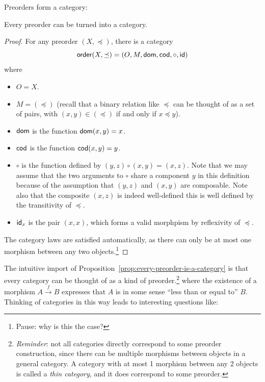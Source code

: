 Preorders form a category:
\begin{construction} \label{prop:every-preorder-is-a-category}
  Every preorder can be turned into a category.
  \label{eq:const-preorder}
\end{construction}
\begin{proof}
  For any preorder \((X,\preceq)\), there is a category
  \[
    \mathsf{order}(X,\preceq) = (O,M,\operatorname{\mathsf{dom}},\operatorname{\mathsf{cod}},\circ,\mathsf{id})
  \]
  where
  \begin{itemize}
    \item \(O = X\).
    \item \(M = (\preceq)\) (recall that a binary relation like \(\preceq\)
      can be thought of as a set of pairs, with \((x,y) \in (\preceq)\)
      if and only if \(x\preceq y\)).
    \item \(\operatorname{\mathsf{dom}}\) is the function \(\operatorname{\mathsf{dom}}(x,y) = x\).
    \item \(\operatorname{\mathsf{cod}}\) is the function \(\operatorname{\mathsf{cod}}(x,y) = y\).
    \item \(\circ\) is the function defined by \((y,z)\circ(x,y) = (x,z)\).
      Note that we may assume that the two arguments to \(\circ\)
      share a component \(y\) in this definition because of the assumption
      that \((y,z)\) and \((x,y)\) are composable.
      Note also that the composite \((x,z)\) is indeed well-defined
      this is well defined by the transitivity of \(\preceq\).
    \item \(\mathsf{id}_x\) is the pair \((x,x)\), which forms a valid morphpism
      by reflexivity of \(\preceq\).
  \end{itemize}
  The category laws are satisfied automatically,
  as there can only be at most one morphism between any two objects.\footnote{Pause: 
  why is this the case?}
\end{proof}
\noindent
The intuitive import of Proposition~\ref{prop:every-preorder-is-a-category}
is that every category can be thought of as a kind of preorder.\footnote{\emph{Reminder}: not all
categories directly correspond to some preorder construction, since there can be multiple 
morphisms between objects in a general category. A category with at most 1 morphism between 
any 2 objects is called a \emph{thin category}, and it does correspond to some preorder.}
where the existence of a morphism \(A\xrightarrow{f} B\)
expresses that \(A\) is in some sense ``less than or equal to'' \(B\).
Thinking of categories in this way leads to interesting questions like:
